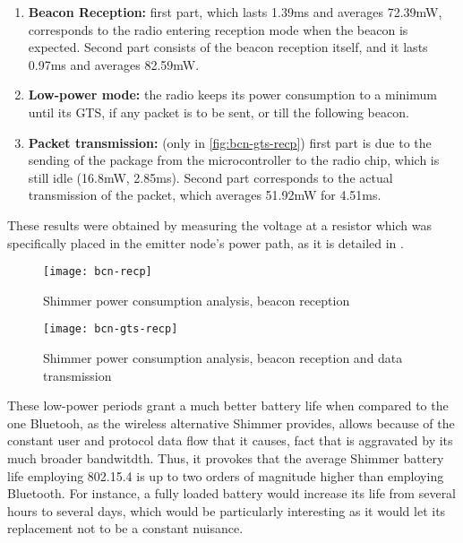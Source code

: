 			\begin{enumerate}
				\item \textbf{Beacon Reception:} first part, which lasts 1.39ms and averages 72.39mW, corresponds
					to the radio entering reception mode when the beacon is expected. Second part consists of
					the beacon reception itself, and it lasts 0.97ms and averages 82.59mW.
				\item \textbf{Low-power mode:} the radio keeps its power consumption to a minimum until its GTS,
					if any packet is to be sent, or till the following beacon.
				\item \textbf{Packet transmission:} (only in \autoref{fig:bcn-gts-recp}) first part is due to the
					sending of the package from the microcontroller to the radio chip, which is still idle 
					(16.8mW, 2.85ms). Second part corresponds to the actual transmission of the packet, which
					averages 51.92mW for 4.51ms.
			\end{enumerate}

			These results were obtained by measuring the voltage at a resistor which was specifically placed
			in the emitter node's power path, as it is detailed in \cite{ecg.del.paper}.


			\begin{figure}[h]
				\texttt{[image: bcn-recp]}
				\centering
				\caption{Shimmer power consumption analysis, beacon reception}
				\label{fig:bcn-recp}
			\end{figure}

			\begin{figure}[h]
				\texttt{[image: bcn-gts-recp]}
				\centering
				\caption{Shimmer power consumption analysis, beacon reception and data transmission}
				\label{fig:bcn-gts-recp}
			\end{figure}

			These low-power periods grant a much better battery life when compared to the one Bluetooh, as the
			wireless alternative Shimmer provides, allows because of the constant user and protocol data flow
			that it causes, fact that is aggravated by its much broader bandwitdth. Thus, it provokes that the
			average Shimmer battery life employing 802.15.4 is up to two orders of magnitude higher than employing
			Bluetooth.  For instance, a fully loaded battery would increase its life from
			several hours to several days, which would be particularly interesting as it would let its
			replacement not to be a constant nuisance. 


